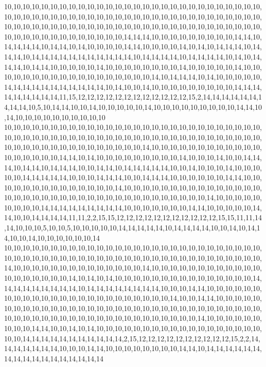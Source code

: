 10,10,10,10,10,10,10,10,10,10,10,10,10,10,10,10,10,10,10,10,10,10,10,10,10,10,10,10,10,10,10,10,10,10,10,10,10,10,10,10,10,10,10,10,10,10,10,10,10,10,10,10,10,10,10,10,10,10,10,10,10,10,10,10,10,10,10,10,10,10,10,10,10,10,10,10,10,10,10,10,10,10,10,10,10,10,10,10,10,10,10,10,10,10,10,10,10,14,14,14,10,10,10,10,10,10,10,10,10,14,14,10,14,14,14,14,10,14,14,10,14,10,10,10,10,14,14,10,10,10,10,14,10,14,10,14,14,14,10,14,14,14,10,14,14,14,14,14,14,14,14,14,14,14,10,14,14,14,14,10,14,14,14,14,10,14,10,14,14,14,10,14,14,10,10,10,10,10,14,10,10,10,10,10,10,10,10,14,10,10,10,10,10,14,10,10,10,10,10,10,10,10,10,10,10,10,10,10,10,10,10,10,14,10,14,14,14,10,14,10,10,10,10,10,14,14,14,14,14,14,14,14,14,14,14,10,14,10,10,14,10,10,10,10,10,10,10,10,10,14,14,14,14,14,14,14,14,14,11,15,12,12,12,12,12,12,12,12,12,12,12,12,15,2,14,14,14,14,14,14,14,14,14,10,5,10,14,14,10,10,14,10,10,10,10,10,14,10,10,10,10,10,10,10,10,10,14,14,10,14,10,10,10,10,10,10,10,10,10,10
10,10,10,10,10,10,10,10,10,10,10,10,10,10,10,10,10,10,10,10,10,10,10,10,10,10,10,10,10,10,10,10,10,10,10,10,10,10,10,10,10,10,10,10,10,10,10,10,10,10,10,10,10,10,10,10,10,10,10,10,10,10,10,10,10,10,10,10,10,10,10,14,10,10,10,10,10,10,10,10,10,10,10,10,10,10,10,10,10,10,14,14,10,14,10,10,10,10,10,10,10,10,10,14,10,10,10,14,10,10,14,14,14,10,14,14,10,14,14,14,10,10,14,14,10,14,14,14,14,14,10,10,14,10,10,10,14,10,10,10,10,10,14,14,14,14,14,10,10,10,14,14,14,10,10,14,14,14,10,10,10,10,10,10,14,14,10,10,10,10,10,10,10,10,10,10,10,10,10,10,14,10,10,10,10,10,10,10,10,10,10,10,10,10,10,10,10,10,10,10,10,10,10,10,10,10,10,10,10,10,10,10,10,10,10,10,10,10,14,10,10,10,10,10,10,10,10,10,14,14,14,14,14,14,14,14,14,10,10,10,10,10,10,10,14,14,10,10,10,10,10,14,14,10,10,14,14,14,14,11,11,2,2,15,15,12,12,12,12,12,12,12,12,12,12,12,15,15,11,11,14,14,10,10,10,5,10,10,5,10,10,10,10,10,14,14,14,14,14,10,14,14,14,14,10,10,14,10,14,14,10,10,14,10,10,10,10,10,10,14
10,10,10,10,10,10,10,10,10,10,10,10,10,10,10,10,10,10,10,10,10,10,10,10,10,10,10,10,10,10,10,10,10,10,10,10,10,10,10,10,10,10,10,10,10,10,10,10,10,10,10,10,10,10,10,10,14,10,10,10,10,10,10,10,10,10,10,10,10,10,10,14,10,10,10,10,10,10,10,10,10,10,10,10,10,10,10,10,10,10,10,14,10,14,10,14,10,10,10,10,10,10,10,10,10,10,10,10,10,10,10,14,14,14,14,14,14,14,14,14,10,14,14,14,14,14,14,14,14,10,10,10,14,14,10,10,10,10,10,10,10,10,10,10,10,10,10,10,10,10,10,10,10,10,10,10,10,10,14,10,10,14,14,10,10,10,10,10,10,10,10,10,10,10,10,10,10,10,10,10,10,10,10,10,10,10,10,10,10,10,10,10,10,10,10,10,10,10,10,10,10,10,10,10,10,10,10,10,10,10,10,10,10,10,10,10,10,14,10,10,10,10,10,10,10,10,10,14,14,10,10,14,10,14,10,10,10,10,10,10,10,10,10,10,10,10,10,10,10,10,10,10,10,10,14,14,14,14,14,14,14,14,14,14,14,2,15,12,12,12,12,12,12,12,12,12,12,15,2,2,14,14,14,14,14,14,14,10,10,10,14,14,10,10,10,10,10,10,10,10,14,14,10,14,14,14,14,14,14,14,14,14,14,14,14,14,14,14,14,14
